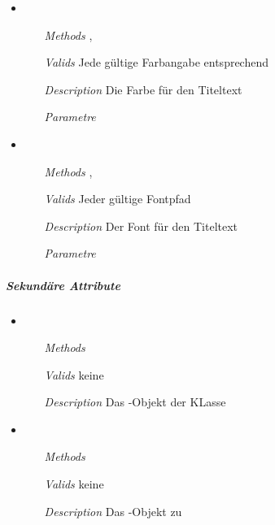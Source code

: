 \begin{itemize}
\item {}
\begin{enumerate}
\item[\textit{Methods}] 
,
\item[\textit{Valids}] Jede g\"ultige Farbangabe entsprechend
\item[\textit{Description}] Die Farbe f\"ur den Titeltext
\item[\textit{Parametre}] 
\end{enumerate}

\item {}
\begin{enumerate}
\item[\textit{Methods}] 
,
\item[\textit{Valids}] Jeder g\"ultige Fontpfad
\item[\textit{Description}] Der Font f\"ur den Titeltext
\item[\textit{Parametre}] 
\end{enumerate}

\end{itemize}


\newpage

\subparagraph{Sekund\"are Attribute}
\begin{itemize}

\item {}
\begin{enumerate}
\item[\textit{Methods}] 
\item[\textit{Valids}] keine
\item[\textit{Description}] Das -Objekt der KLasse
\end{enumerate}

\item {}
\begin{enumerate}
\item[\textit{Methods}] 
\item[\textit{Valids}] keine
\item[\textit{Description}] Das -Objekt
zu 
\end{enumerate}

\end{itemize}

